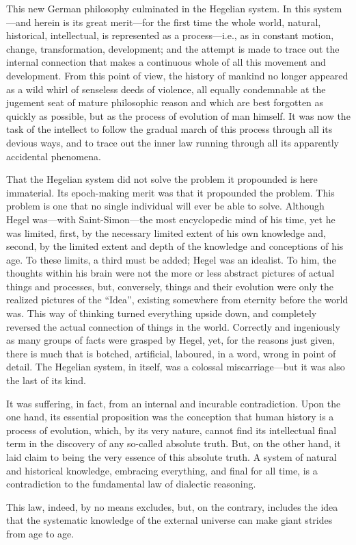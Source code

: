 This new German philosophy culminated in the Hegelian system. In this
system---and herein is its great merit---for the first time the whole world,
natural, historical, intellectual, is represented as a process---i.e., as in
constant motion, change, transformation, development; and the attempt is made to
trace out the internal connection that makes a continuous whole of all this
movement and development. From this point of view, the history of mankind no
longer appeared as a wild whirl of senseless deeds of violence, all equally
condemnable at the jugement seat of mature philosophic reason and which are best
forgotten as quickly as possible, but as the process of evolution of man
himself. It was now the task of the intellect to follow the gradual march of
this process through all its devious ways, and to trace out the inner law running
through all its apparently accidental phenomena.

That the Hegelian system did not solve the problem it propounded is here
immaterial. Its epoch-making merit was that it propounded the problem. This
problem is one that no single individual will ever be able to solve. Although
Hegel was---with Saint-Simon---the most encyclopedic mind of his time, yet he
was limited, first, by the necessary limited extent of his own knowledge and,
second, by the limited extent and depth of the knowledge and conceptions of his
age. To these limits, a third must be added; Hegel was an idealist. To him, the
thoughts within his brain were not the more or less abstract pictures of actual
things and processes, but, conversely, things and their evolution were only the
realized pictures of the ``Idea'', existing somewhere from eternity before the
world was. This way of thinking turned everything upside down, and completely
reversed the actual connection of things in the world. Correctly and ingeniously
as many groups of facts were grasped by Hegel, yet, for the reasons just given,
there is much that is botched, artificial, laboured, in a word, wrong in point
of detail. The Hegelian system, in itself, was a colossal miscarriage---but it
was also the last of its kind.

It was suffering, in fact, from an internal and incurable contradiction. Upon
the one hand, its essential proposition was the conception that human history is
a process of evolution, which, by its very nature, cannot find its intellectual
final term in the discovery of any so-called absolute truth. But, on the other
hand, it laid claim to being the very essence of this absolute truth. A system
of natural and historical knowledge, embracing everything, and final for all
time, is a contradiction to the fundamental law of dialectic reasoning.

This law, indeed, by no means excludes, but, on the contrary, includes the idea
that the systematic knowledge of the external universe can make giant strides
from age to age.

\printendnotes